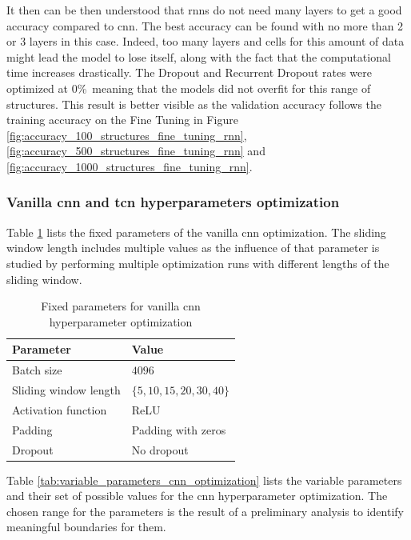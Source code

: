 \documentclass[conference]{IEEEtran}
\begin{document}
It then can be then understood that \glspl{rnn} do not need many layers to get a good accuracy compared to \gls{cnn}. The best accuracy can be found with no more than 2 or 3 layers in this case. Indeed, too many layers and cells for this amount of data might lead the model to lose itself, along with the fact that the computational time increases drastically. The Dropout and Recurrent Dropout rates were optimized at 0\%\ meaning that the models did not overfit for this range of structures. This result is better visible as the validation accuracy follows the training accuracy on the Fine Tuning in Figure \ref{fig:accuracy_100_structures_fine_tuning_rnn}, \ref{fig:accuracy_500_structures_fine_tuning_rnn} and \ref{fig:accuracy_1000_structures_fine_tuning_rnn}.

\subsubsection{Vanilla \gls{cnn} and \gls{tcn} hyperparameters optimization}

Table \ref{tab:fixed_parameters_cnn_optimization} lists the fixed parameters of the vanilla \gls{cnn} optimization. The sliding window length includes multiple values as the influence of that parameter is studied by performing multiple optimization runs with different lengths of the sliding window.

\begin{table}[htp]
	\centering
	\caption{Fixed parameters for vanilla \gls{cnn} hyperparameter optimization}
	\label{tab:fixed_parameters_cnn_optimization}
	\begin{tabular}{ll}
		\textbf{Parameter} & \textbf{Value} \\
		\hline
		Batch size & $ 4096 $ \\
		Sliding window length & $ \{5, 10, 15, 20, 30, 40\} $ \\
		Activation function & ReLU \\
		Padding & Padding with zeros \\
		Dropout & No dropout
	\end{tabular}
\end{table}

Table \ref{tab:variable_parameters_cnn_optimization} lists the variable parameters and their set of possible values for the \gls{cnn} hyperparameter optimization. The chosen range for the parameters is the result of a preliminary analysis to identify meaningful boundaries for them.
\end{document}
